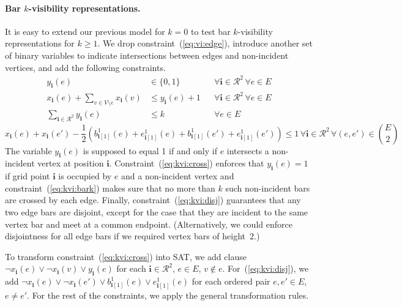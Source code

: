 \documentclass[runningheads]{llncs}
\newcommand{\bvec}[1]{\mathbf{#1}}
\newcounter{constr}
\begin{document}
\paragraph{Bar $k$-visibility representations.}
It is easy to extend our previous model for $k=0$ to test bar
$k$-visibility representations for $k\ge 1$. We drop
constraint~(\ref{eq:vi:edge}), introduce another set of binary
variables to indicate intersections between edges and non-incident
vertices, and add the following constraints.
\begin{align}
  \label{eq:kvi:vars} y_\bvec{i}(e) &\in \{0,1\} && \forall \bvec{i}
\in \mathcal R^2\, \forall e \in E\\
  \label{eq:kvi:cross} x_\bvec{i}(e) + \sum_{v \in V\setminus e}
x_\bvec{i}(v) &\le y_\bvec{i}(e)+1 && \forall \bvec{i} \in \mathcal
R^2\, \forall e \in E\\
  \label{eq:kvi:bark} \sum_{\bvec{i} \in \mathcal R^2} y_\bvec{i}(e)
&\le k && \forall e \in E
\end{align}
\vspace{-2ex}
\begin{equation}
    \label{eq:kvi:disj} x_\bvec{i}(e) + x_\bvec{i}(e') - \frac{1}{2}
(b_{\bvec{i}[1]}^1(e) + e_{\bvec{i}[1]}^1(e) + b_{\bvec{i}[1]}^1(e') +
e_{\bvec{i}[1]}^1(e')) \le 1 \, \forall \bvec{i} \in \mathcal R^2\,
\forall (e,e') \in \binom{E}{2}
\end{equation}
The variable $y_\bvec{i}(e)$ is supposed to equal 1 if and only if $e$
intersects a non-incident vertex at position $\bvec{i}$.
Constraint~(\ref{eq:kvi:cross}) enforces that $y_\bvec{i}(e)=1$ if
grid point $\bvec{i}$ is occupied by $e$ and a non-incident vertex and
constraint~(\ref{eq:kvi:bark}) makes sure that no more than $k$ such
non-incident bars are crossed by each edge. Finally,
constraint~(\ref{eq:kvi:disj}) guarantees that any two edge bars are
disjoint, except for the case that they are incident to the same
vertex bar and meet at a common endpoint. (Alternatively, we could
enforce disjointness for all edge bars if we required vertex bars of
height~$2$.)

To transform constraint~(\ref{eq:kvi:cross}) into SAT,
we add clause $\neg x_\bvec{i}(e) \vee \neg x_\bvec{i}(v) \vee
y_\bvec{i}(e)$
for each $\bvec{i} \in \mathcal R^2$, $e \in E$, $v \notin e$.
For~(\ref{eq:kvi:disj}), we add
$\neg x_\bvec{i}(e) \vee \neg x_\bvec{i}(e') \vee b_{\bvec{i}[1]}^1(e)
\vee e_{\bvec{i}[1]}^1(e)$
for each ordered pair $e,e' \in E$, $e \neq e'$.
For the rest of the constraints, we apply the general transformation
rules.
\end{document}

